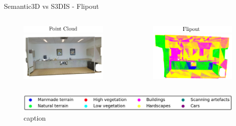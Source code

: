 \documentclass[aspectratio=169]{beamer}
\begin{document}
\begin{frame}{Semantic3D vs S3DIS - Flipout}
    \begin{columns}
        \begin{column}{0.5\textwidth}
            \begin{figure}
                \centering
                \includegraphics[scale=0.5]{images/s3dis/s3dis_fout_orig_head.png}
                \includegraphics[scale=0.5]{images/s3dis/s3dis_fout_orig.png}
            \end{figure}
        \end{column}
        \begin{column}{0.5\textwidth}
            \begin{figure}
                \centering
                \includegraphics[scale=0.5]{images/s3dis/s3dis_fout_semseg_head.png}
                \includegraphics[scale=0.5]{images/s3dis/s3dis_fout_semseg.png}
            \end{figure}
        \end{column}
    \end{columns}
    \begin{figure}
        \centering
        \includegraphics[scale=0.25]{images/legend.jpg}
        \caption{caption}
    \end{figure}
\end{frame}
\end{document}
